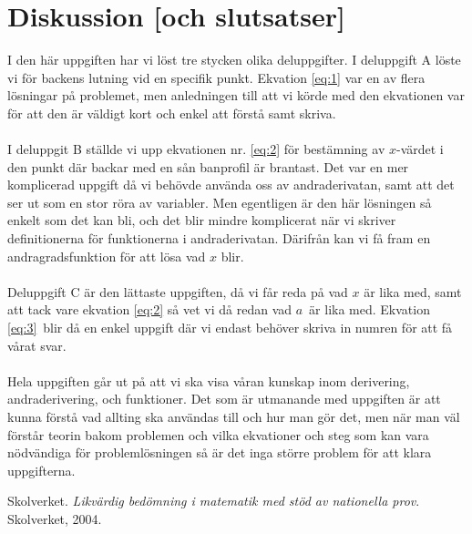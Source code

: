 \documentclass[a4paper,12pt]{article}
\begin{document}
\section{Diskussion [och slutsatser]}
\label{sec:disk}
  I den här uppgiften har vi löst tre stycken olika deluppgifter. 
  I deluppgift A \cite{Skolverk} löste vi för backens lutning vid en 
  specifik punkt. Ekvation \ref{eq:1} var en av flera lösningar på 
  problemet, men anledningen till att vi körde med den ekvationen var 
  för att den är väldigt kort och enkel att förstå samt skriva. 
  \\
  \\
  I deluppgit B \cite{Skolverk} ställde vi upp ekvationen nr. \ref{eq:2} för 
  bestämning av $x$-värdet i den punkt där backar med en sån banprofil är 
  brantast. Det var en mer komplicerad uppgift då vi behövde använda oss av 
  andraderivatan, samt att det ser ut som en stor röra av variabler. Men 
  egentligen är den här lösningen så enkelt som det kan bli, och det blir 
  mindre komplicerat när vi skriver definitionerna för funktionerna i 
  andraderivatan. Därifrån kan vi få fram en andragradsfunktion för att lösa 
  vad $x$ blir.
  \\
  \\
  Deluppgift C \cite{Skolverk} är den lättaste uppgiften, då vi får reda på 
  vad $x$ är lika med, samt att tack vare ekvation \ref{eq:2} så vet vi då 
  redan vad $a$ är lika med. Ekvation \ref{eq:3} blir då en enkel uppgift 
  där vi endast behöver skriva in numren för att få vårat svar. 
  \\
  \\
  Hela uppgiften går ut på att vi ska visa våran kunskap inom derivering,
  andraderivering, och funktioner. Det som är utmanande med uppgiften är att
  kunna förstå vad allting ska användas till och hur man gör det, men när 
  man väl förstår teorin bakom problemen och vilka ekvationer och steg som
  kan vara nödvändiga för problemlösningen så är det inga större problem 
  för att klara uppgifterna. 
\begin{thebibliography}{99}
%
Skolverket.
\textit{Likvärdig bedömning i matematik med stöd av nationella prov}. 
Skolverket, 2004.

\end{thebibliography}
%
\end{document}
